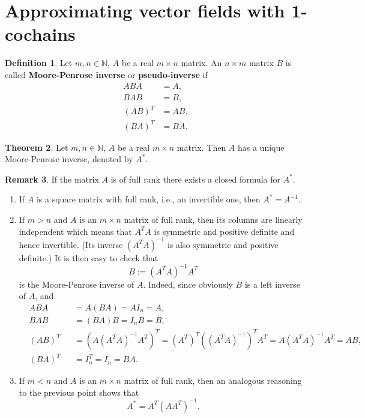 \documentclass[fleqn]{article}
\theoremstyle{definition}
\newtheorem{theorem}{Theorem}[section]
\newtheorem{definition}[theorem]{Definition}
\newtheorem{remark}[theorem]{Remark}
\begin{document}
\section{Approximating vector fields with 1-cochains}

\begin{definition}
  Let $m, n \in \mathbb{N}$, $A$ be a real $m \times n$ matrix.
  An $n \times m$ matrix $B$ is called \textbf{Moore-Penrose inverse} or
  \textbf{pseudo-inverse} if
  \begin{subequations}
    \begin{align}
      A B A & = A, \\
      B A B & = B, \\
      (A B)^T & = A B, \\
      (B A)^T & = B A.
    \end{align}
  \end{subequations}
\end{definition}

\begin{theorem}
  Let $m, n \in \mathbb{N}$, $A$ be a real $m \times n$ matrix.
  Then $A$ has a unique Moore-Penrose inverse, denoted by $A^*$.
\end{theorem}

\begin{remark}
  If the matrix $A$ is of full rank there exists a closed formula for $A^*$.
  \begin{enumerate}
    \item
      If $A$ is a square matrix with full rank, i.e., an invertible one, then
      $A^* = A^{-1}$.
    \item
      If $m > n$ and $A$ is an $m \times n$ matrix of full rank, then its
      columns are linearly independent which means that $A^T A$ is
      symmetric and positive definite and hence invertible.
      (Its inverse $(A^T A)^{-1}$ is also symmetric and positive definite.)
      It is then easy to check that
      \begin{equation}
        B := (A^T A)^{-1} A^T
      \end{equation}
      is the Moore-Penrose inverse of $A$.
      Indeed, since obviously $B$ is a left inverse of $A$, and 
      \begin{subequations}
        \begin{align}
          & A B A && = A (B A) = A I_n = A, \\
          & B A B && = (B A) B = I_n B = B, \\
          & (A B)^T && = (A (A^T A)^{-1} A^T)^T
            = (A^T)^T ((A^T A)^{-1})^T A^T = A (A^T A)^{-1} A^T = A B, \\
          & (B A)^T && = I_n^T = I_n = B A.
        \end{align}
      \end{subequations}
    \item
      If $m < n$ and $A$ is an $m \times n$ matrix of full rank, then an
      analogous reasoning to the previous point shows that
      \begin{equation}
        A^* = A^T (A A^T)^{-1}.
      \end{equation}
  \end{enumerate}
\end{remark}
\end{document}

